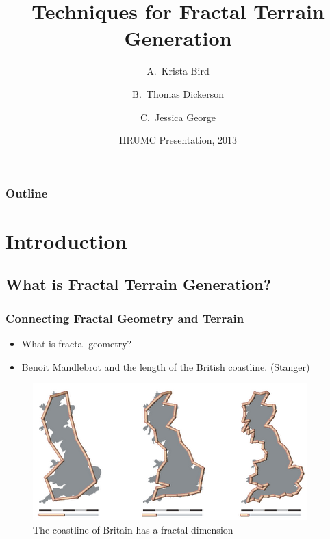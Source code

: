 \documentclass{beamer}
\title[Techniques for Fractal Terrain Generation] %
{Techniques for Fractal Terrain Generation}
\author[K. Bird, T. Dickerson, J. George] 
{A.~Krista Bird \and B.~Thomas Dickerson \and C.~Jessica George}
\date[HRUMC] %
{HRUMC Presentation, 2013}
\begin{document}
\begin{frame}
  \titlepage
\end{frame}

\begin{frame}
  \frametitle{Outline}
  \tableofcontents
\end{frame}





\section{Introduction}
\subsection{What is Fractal Terrain Generation?}

\begin{frame}
  \frametitle{Connecting Fractal Geometry and Terrain}
  \begin{itemize}
  \item What is fractal geometry?
  \item Benoit Mandlebrot and the length of the British coastline. (Stanger)
  \end{itemize}
  \begin{center}
  \begin{figure}[h]
  \includegraphics[scale=0.5]{BritainCoastline.png}
  \caption{The coastline of Britain has a fractal dimension}
  \label{fig:britcoast}
  \end{figure}
  \end{center}
\end{frame}
\end{document}
